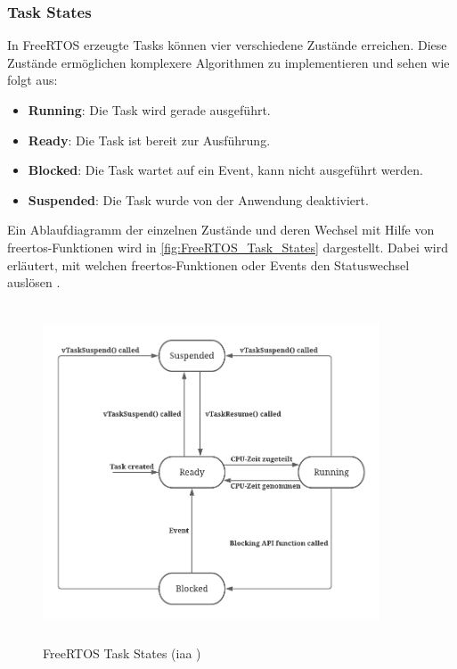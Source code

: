 \documentclass[../EDF Master Thesis.tex]{subfiles}
\begin{document}
\clearpage

\subsubsection{Task States} \label{section:task_states}
In FreeRTOS erzeugte Tasks können vier verschiedene Zustände erreichen.
Diese Zustände ermöglichen komplexere Algorithmen zu implementieren und sehen wie folgt aus:

\begin{itemize}
    \item \textbf{Running}: Die Task wird gerade ausgeführt.
    \item \textbf{Ready}: Die Task ist bereit zur Ausführung.
    \item \textbf{Blocked}: Die Task wartet auf ein Event, kann nicht ausgeführt werden.
    \item \textbf{Suspended}: Die Task wurde von der Anwendung deaktiviert.
\end{itemize}
\begin{center}
    \parencite{freertos-task-states}
\end{center}

Ein Ablaufdiagramm der einzelnen Zustände und deren Wechsel mit Hilfe von \ac{freertos}-Funktionen wird in \autoref{fig:FreeRTOS_Task_States} dargestellt.
Dabei wird erläutert, mit welchen \ac{freertos}-Funktionen oder Events den Statuswechsel auslösen \autocite{freertos-task-states}.

\begin{figure}[H]
    \centering
    \includegraphics[height=10cm, width=10cm]{./attachments/FreeRTOS_Task_States.pdf}
    \caption[FreeRTOS Task States]{FreeRTOS Task States (\ac{iaa} \cite{freertos-task-states})}
    \label{fig:FreeRTOS_Task_States}
\end{figure}
\end{document}
